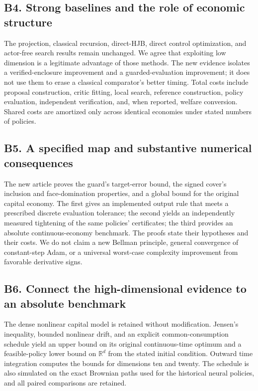 \subsection*{B4. Strong baselines and the role of economic structure}
The projection, classical recursion, direct-HJB, direct control optimization, and actor-free search results remain unchanged. We agree that exploiting low dimension is a legitimate advantage of those methods. The new evidence isolates a verified-enclosure improvement and a guarded-evaluation improvement; it does not use them to erase a classical comparator's better timing. Total costs include proposal construction, critic fitting, local search, reference construction, policy evaluation, independent verification, and, when reported, welfare conversion. Shared costs are amortized only across identical economies under stated numbers of policies.

\subsection*{B5. A specified map and substantive numerical consequences}
The new article proves the guard's target-error bound, the signed cover's inclusion and face-domination properties, and a global bound for the original capital economy. The first gives an implemented output rule that meets a prescribed discrete evaluation tolerance; the second yields an independently measured tightening of the same policies' certificates; the third provides an absolute continuous-economy benchmark. The proofs state their hypotheses and their costs. We do not claim a new Bellman principle, general convergence of constant-step Adam, or a universal worst-case complexity improvement from favorable derivative signs.

\subsection*{B6. Connect the high-dimensional evidence to an absolute benchmark}
The dense nonlinear capital model is retained without modification. Jensen's inequality, bounded nonlinear drift, and an explicit common-consumption schedule yield an upper bound on its original continuous-time optimum and a feasible-policy lower bound on $\mathbb R^d$ from the stated initial condition. Outward time integration computes the bounds for dimensions ten and twenty. The schedule is also simulated on the exact Brownian paths used for the historical neural policies, and all paired comparisons are retained.

